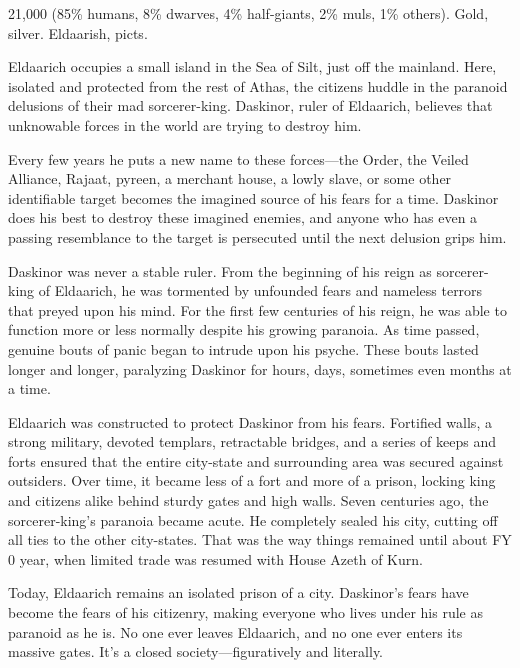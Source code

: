 {21,000 (85\% humans, 8\% dwarves, 4\% half-giants, 2\% muls, 1\% others).}
{Gold, silver.}
{Eldaarish, picts.}
{

	Eldaarich occupies a small island in the Sea of Silt, just off the mainland. Here, isolated and protected from the rest of Athas, the citizens huddle in the paranoid delusions of their mad sorcerer-king. Daskinor, ruler of Eldaarich, believes that unknowable forces in the world are trying to destroy him.

	Every few years he puts a new name to these forces---the Order, the Veiled Alliance, Rajaat, pyreen, a merchant house, a lowly slave, or some other identifiable target becomes the imagined source of his fears for a time. Daskinor does his best to destroy these imagined enemies, and anyone who has even a passing resemblance to the target is persecuted until the next delusion grips him.

	Daskinor was never a stable ruler. From the beginning of his reign as sorcerer-king of Eldaarich, he was tormented by unfounded fears and nameless terrors that preyed upon his mind. For the first few centuries of his reign, he was able to function more or less normally despite his growing paranoia. As time passed, genuine bouts of panic began to intrude upon his psyche. These bouts lasted longer and longer, paralyzing Daskinor for hours, days, sometimes even months at a time.

	Eldaarich was constructed to protect Daskinor from his fears. Fortified walls, a strong military, devoted templars, retractable bridges, and a series of keeps and forts ensured that the entire city-state and surrounding area was secured against outsiders. Over time, it became less of a fort and more of a prison, locking king and citizens alike behind sturdy gates and high walls. Seven centuries ago, the sorcerer-king's paranoia became acute. He completely sealed his city, cutting off all ties to the other city-states. That was the way things remained until about FY 0 year, when limited trade was resumed with House Azeth of Kurn.

	Today, Eldaarich remains an isolated prison of a city. Daskinor's fears have become the fears of his citizenry, making everyone who lives under his rule as paranoid as he is. No one ever leaves Eldaarich, and no one ever enters its massive gates. It's a closed society---figuratively and literally.
}
